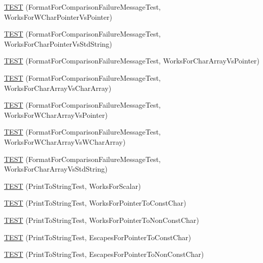 \begin{DoxyCompactItemize}
\item 
\hyperlink{namespacetesting_1_1gtest__printers__test_a735171f4ba0a9dffee9c4c7321107822}{T\+E\+ST} (Format\+For\+Comparison\+Failure\+Message\+Test, Works\+For\+W\+Char\+Pointer\+Vs\+Pointer)
\item 
\hyperlink{namespacetesting_1_1gtest__printers__test_ab5a910170489276c14b817b70d4feb96}{T\+E\+ST} (Format\+For\+Comparison\+Failure\+Message\+Test, Works\+For\+Char\+Pointer\+Vs\+Std\+String)
\item 
\hyperlink{namespacetesting_1_1gtest__printers__test_ac25834e0463cf9f3d231db24e7b220e5}{T\+E\+ST} (Format\+For\+Comparison\+Failure\+Message\+Test, Works\+For\+Char\+Array\+Vs\+Pointer)
\item 
\hyperlink{namespacetesting_1_1gtest__printers__test_aba32640344f0186de5fbb6bb47e0c5a5}{T\+E\+ST} (Format\+For\+Comparison\+Failure\+Message\+Test, Works\+For\+Char\+Array\+Vs\+Char\+Array)
\item 
\hyperlink{namespacetesting_1_1gtest__printers__test_a1e95289500400eff5fdcd45c5864a6d2}{T\+E\+ST} (Format\+For\+Comparison\+Failure\+Message\+Test, Works\+For\+W\+Char\+Array\+Vs\+Pointer)
\item 
\hyperlink{namespacetesting_1_1gtest__printers__test_af4b502fb5745d2ee0bfb81d1c8eb95f6}{T\+E\+ST} (Format\+For\+Comparison\+Failure\+Message\+Test, Works\+For\+W\+Char\+Array\+Vs\+W\+Char\+Array)
\item 
\hyperlink{namespacetesting_1_1gtest__printers__test_ac2300073f401f783ff7b1ef97d2cbd6d}{T\+E\+ST} (Format\+For\+Comparison\+Failure\+Message\+Test, Works\+For\+Char\+Array\+Vs\+Std\+String)
\item 
\hyperlink{namespacetesting_1_1gtest__printers__test_a5d1bc4b12c18ccaec2ced9f45c092567}{T\+E\+ST} (Print\+To\+String\+Test, Works\+For\+Scalar)
\item 
\hyperlink{namespacetesting_1_1gtest__printers__test_a68100148758516ebab9c761ca7778586}{T\+E\+ST} (Print\+To\+String\+Test, Works\+For\+Pointer\+To\+Const\+Char)
\item 
\hyperlink{namespacetesting_1_1gtest__printers__test_a1db34d8760c17157572ce2877007d15a}{T\+E\+ST} (Print\+To\+String\+Test, Works\+For\+Pointer\+To\+Non\+Const\+Char)
\item 
\hyperlink{namespacetesting_1_1gtest__printers__test_ab8fce4287e837cfcd851ded56b62f9ce}{T\+E\+ST} (Print\+To\+String\+Test, Escapes\+For\+Pointer\+To\+Const\+Char)
\item 
\hyperlink{namespacetesting_1_1gtest__printers__test_a7203081ef422f0835643d2c54b8ebf28}{T\+E\+ST} (Print\+To\+String\+Test, Escapes\+For\+Pointer\+To\+Non\+Const\+Char)

\end{DoxyCompactItemize}
